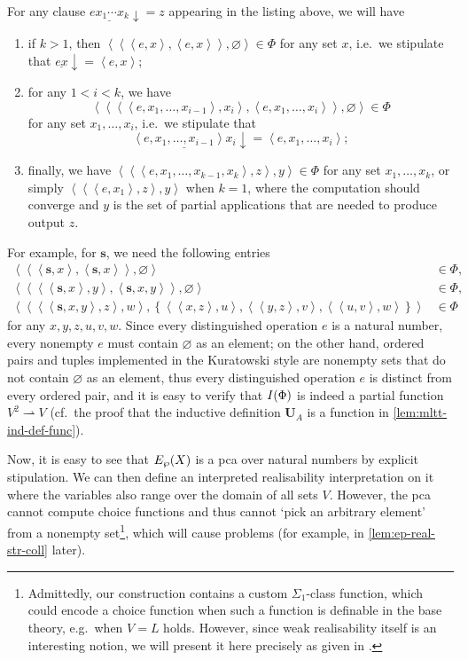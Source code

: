 \documentclass[12pt,openany]{book}
\theoremstyle{plain}
\theoremstyle{definition}
\newcommand\uplabel[1]{\textup{(#1)}}
\newcommand\tuple[1]{\left\langle #1 \right\rangle}
\newcommand\bs{\mathbf{s}}
\newcommand\bU{\mathbf{U}}
\begin{document}
For any clause $\underline{e x_1 \cdots x_k} {\downarrow} = z$ appearing in the listing above, we will have
\begin{enumerate}[label=\uplabel{\arabic*}]
  \item if $k > 1$, then $\tuple{\tuple{\tuple{e, x}, \tuple{e, x}}, \varnothing} \in \Phi$ for any set $x$, i.e.\ we stipulate that $\underline{ex} {\downarrow} = \tuple{e, x}$;
  \item for any $1 < i < k$, we have
        \[\tuple{\tuple{\tuple{\tuple{e, x_1, \ldots, x_{i - 1}}, x_i}, \tuple{e, x_1, \ldots, x_i}}, \varnothing} \in \Phi\]
        for any set $x_1, \ldots, x_i$, i.e.\ we stipulate that
        \[\underline{\tuple{e, x_1, \ldots, x_{i - 1}} x_i} {\downarrow} = \tuple{e, x_1, \ldots, x_i};\]
  \item finally, we have $\tuple{\tuple{\tuple{e, x_1, \ldots, x_{k - 1}, x_k}, z}, y} \in \Phi$ for any set $x_1, \ldots, x_k$, or simply $\tuple{\tuple{\tuple{e, x_1}, z}, y}$ when $k = 1$, where the computation should converge and $y$ is the set of partial applications that are needed to produce output $z$.
\end{enumerate}
For example, for $\bs$, we need the following entries
\begin{align*}
  \tuple{\tuple{\tuple{\bs, x}, \tuple{\bs, x}}, \varnothing}                                                                               & \in \Phi, \\
  \tuple{\tuple{\tuple{\tuple{\bs, x}, y}, \tuple{\bs, x, y}}, \varnothing}                                                                 & \in \Phi, \\
  \tuple{\tuple{\tuple{\tuple{\bs, x, y}, z}, w}, \left\{\tuple{\tuple{x, z}, u}, \tuple{\tuple{y, z}, v}, \tuple{\tuple{u, v}, w}\right\}} & \in \Phi
\end{align*}
for any $x, y, z, u, v, w$. Since every distinguished operation $e$ is a natural number, every nonempty $e$ must contain $\varnothing$ as an element; on the other hand, ordered pairs and tuples implemented in the Kuratowski style are nonempty sets that do not contain $\varnothing$ as an element, thus every distinguished operation $e$ is distinct from every ordered pair, and it is easy to verify that $I\mleft(\Phi\mright)$ is indeed a partial function $V^2 \rightharpoonup V$ (cf.\ the proof that the inductive definition $\bU_A$ is a function in \autoref{lem:mltt-ind-def-func}).

Now, it is easy to see that $E_\wp\mleft(X\mright)$ is a pca over natural numbers by explicit stipulation. We can then define an interpreted realisability interpretation on it where the variables also range over the domain of all sets $V$. However, the pca cannot compute choice functions and thus cannot `pick an arbitrary element' from a nonempty set\footnote{Admittedly, our construction contains a custom $\Sigma_1$-class function, which could encode a choice function when such a function is definable in the base theory, e.g.\ when $V = L$ holds. However, since weak realisability itself is an interesting notion, we will present it here precisely as given in \cite{rathjen12-czf-powerset}.}, which will cause problems (for example, in \autoref{lem:ep-real-str-coll} later).
\end{document}
